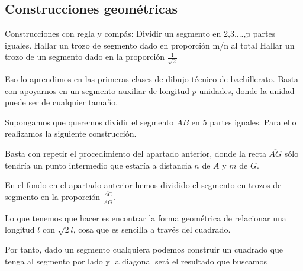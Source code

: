 \newpage
\subsection{Construcciones geométricas}
\begin{problem}[17]
\ppart Construcciones con regla y compás: Dividir un segmento en 2,3,...,p partes iguales.
\ppart Hallar un trozo de segmento dado en proporción m/n al total
\ppart Hallar un trozo de un segmento dado en la proporción $\frac{1}{\sqrt{2}}$

\solution
{}

\spart

Eso lo aprendimos en las primeras clases de dibujo técnico de bachillerato. Basta con apoyarnos en un segmento auxiliar de longitud $p$ unidades, donde la unidad puede ser de cualquier tamaño.

Supongamos que queremos dividir el segmento $\overline{AB}$ en 5 partes iguales. Para ello realizamos la siguiente construcción.

\begin{center}
\end{center}

\spart

Basta con repetir el procedimiento del apartado anterior, donde la recta $\overline{AG}$ sólo tendría un punto intermedio que estaría a distancia $n$ de $A$ y $m$ de $G$.

En el fondo en el apartado anterior hemos dividido el segmento en trozos de segmento en la proporción $\frac{\overline{AC}}{\overline{AG}}$.


\spart

Lo que tenemos que hacer es encontrar la forma geométrica de relacionar una longitud $l$ con $\sqrt{2}l$, cosa que es sencilla a través del cuadrado.

Por tanto, dado un segmento cualquiera podemos construir un cuadrado que tenga al segmento por lado y la diagonal será el resultado que buscamos


\end{problem}

